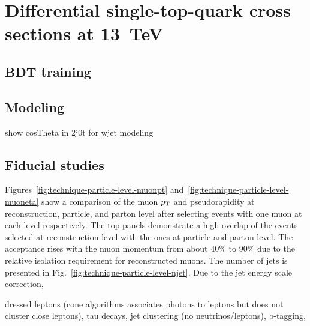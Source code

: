 \chapter{Differential single-top-quark cross sections at 13~TeV}
\label{ch:diff13}

\section{BDT training}
\label{sec:diff13-bdt}

\section{Modeling}
\label{sec:diff13-modeling}
show cosTheta in 2j0t for wjet modeling



\section{Fiducial studies}
\label{sec:diff13-fiducial-studies}


Figures~\ref{fig:technique-particle-level-muonpt} and~\ref{fig:technique-particle-level-muoneta} show a comparison of the muon $p_\mathrm{T}$ and pseudorapidity at reconstruction, particle, and parton level after selecting events with one muon at each level respectively. The top panels demonstrate a high overlap of the events selected at reconstruction level with the ones at particle and parton level. The acceptance rises with the muon momentum from about 40\% to 90\% due to the relative isolation requirement for reconstructed muons. The number of jets is presented in Fig.~\ref{fig:technique-particle-level-njet}. Due to the jet energy scale correction, 


dressed leptons (cone algorithms associates photons to leptons but does not cluster close leptons), tau decays, jet clustering (no neutrinos/leptons), b-tagging,




